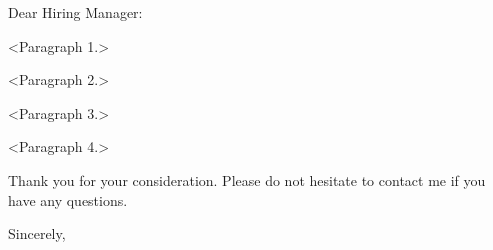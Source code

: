 \documentclass{coverletter}
\begin{document}
\makeheader
\opening{Dear Hiring Manager:}


<Paragraph 1.>

<Paragraph 2.>

<Paragraph 3.>

<Paragraph 4.>

Thank you for your consideration. Please do not hesitate to contact me if you have any questions.

\closing{Sincerely,}
\end{document}

